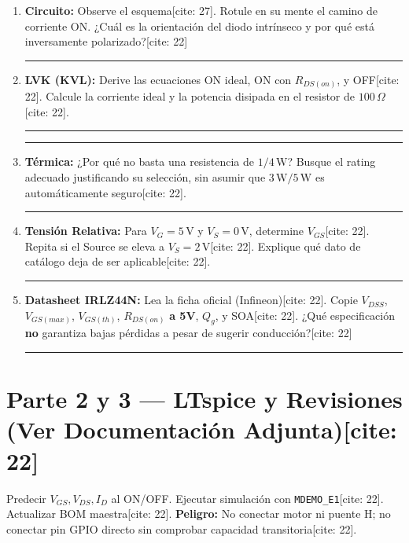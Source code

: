 \documentclass[11pt, a4paper]{article}
\begin{document}
\begin{enumerate}
    \item \textbf{Circuito:} Observe el esquema[cite: 27]. Rotule en su mente el camino de corriente ON. ¿Cuál es la orientación del diodo intrínseco y por qué está inversamente polarizado?[cite: 22]
    \par\vspace{0.1cm}\noindent\rule{\linewidth}{0.15mm}
    
    \item \textbf{LVK (KVL):} Derive las ecuaciones ON ideal, ON con $R_{DS(on)}$, y OFF[cite: 22]. Calcule la corriente ideal y la potencia disipada en el resistor de $100\,\Omega$[cite: 22].
    \par\vspace{0.1cm}\noindent\rule{\linewidth}{0.15mm}
    \par\vspace{0.3cm}\noindent\rule{\linewidth}{0.15mm}
    
    \item \textbf{Térmica:} ¿Por qué no basta una resistencia de $1/4\,\text{W}$? Busque el rating adecuado justificando su selección, sin asumir que $3\,\text{W}/5\,\text{W}$ es automáticamente seguro[cite: 22].
    \par\vspace{0.1cm}\noindent\rule{\linewidth}{0.15mm}
    
    \item \textbf{Tensión Relativa:} Para $V_G=5\,\text{V}$ y $V_S=0\,\text{V}$, determine $V_{GS}$[cite: 22]. Repita si el Source se eleva a $V_S=2\,\text{V}$[cite: 22]. Explique qué dato de catálogo deja de ser aplicable[cite: 22].
    \par\vspace{0.1cm}\noindent\rule{\linewidth}{0.15mm}
    
    \item \textbf{Datasheet IRLZ44N:} Lea la ficha oficial (Infineon)[cite: 22]. Copie $V_{DSS}$, $V_{GS(max)}$, $V_{GS(th)}$, $R_{DS(on)}$ \textbf{a 5V}, $Q_g$, y SOA[cite: 22]. ¿Qué especificación \textbf{no} garantiza bajas pérdidas a pesar de sugerir conducción?[cite: 22]
    \par\vspace{0.1cm}\noindent\rule{\linewidth}{0.15mm}
\end{enumerate}

\section*{Parte 2 y 3 — LTspice y Revisiones (Ver Documentación Adjunta)[cite: 22]}
Predecir $V_{GS}, V_{DS}, I_D$ al ON/OFF. Ejecutar simulación con \texttt{MDEMO\_E1}[cite: 22]. Actualizar BOM maestra[cite: 22]. \textbf{Peligro:} No conectar motor ni puente H; no conectar pin GPIO directo sin comprobar capacidad transitoria[cite: 22].
\end{document}
